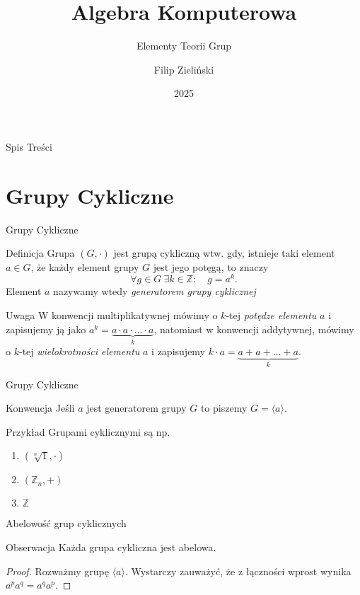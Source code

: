 \documentclass{beamer}
\title{Algebra Komputerowa}
\subtitle{Elementy Teorii Grup}
\author{Filip Zieli\'nski}
\date{2025}
\begin{document}
\begin{frame}
    \titlepage
\end{frame}
 
\begin{frame}{Spis Treści}
    \tableofcontents
\end{frame}

\section{Grupy Cykliczne}

\begin{frame}{Grupy Cykliczne}
    \begin{block}{Definicja}
        Grupa $(G,\cdot)$ jest \alert{grupą cykliczną} wtw. gdy, istnieje taki element $a \in G$, że każdy element grupy $G$
        jest jego potęgą, to znaczy
        $$\forall g \in G \ \exists k \in \mathbb{Z}  : \quad g = a^k .$$
        Element $a$ nazywamy wtedy \textit{generatorem grupy cyklicznej}
    \end{block}
    \begin{alertblock}{Uwaga}
        W konwencji multiplikatywnej mówimy o $k$-tej \textit{potędze elementu} $a$ i zapisujemy ją jako
        $a^k = \underbrace{a \cdot a \cdot \ldots \cdot a}_{k}$, natomiast w konwencji addytywnej, mówimy o
        $k$-tej \textit{wielokrotności elementu} $a$ i zapisujemy $k \cdot a = \underbrace{a + a + \ldots + a}_{k}$.
    \end{alertblock}

\end{frame}

\begin{frame}{Grupy Cykliczne}
    \begin{alertblock}{Konwencja}
        Jeśli $a$ jest generatorem grupy $G$ to piszemy $G = \langle a \rangle.$ 
    \end{alertblock}
    \begin{exampleblock}{Przykład}
        Grupami cyklicznymi są np.
        \begin{enumerate}
            \item $(\sqrt[n]{1}, \cdot)$
            \item $(\mathbb{Z}_n, +)$
            \item $\mathbb{Z}$ 
        \end{enumerate}
    \end{exampleblock}
\end{frame}

\begin{frame}{Abelowość grup cyklicznych}
    \begin{block}{Obserwacja}
        Każda grupa cykliczna jest abelowa.
    \end{block}
    \begin{proof}
        Rozważmy grupę $\langle a \rangle $. Wystarczy zauważyć, że z łączności wprost wynika $a^pa^q = a^qa^p.$
    \end{proof}
\end{frame}
    
\end{document}
